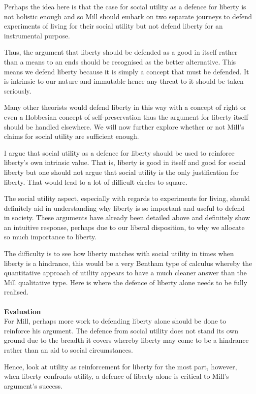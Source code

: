 \documentclass[12pt, letterpaper]{article}
\begin{document}
Perhaps the idea here is that the case for social utility as a defence for liberty is not holistic enough and so Mill should embark on two separate journeys to defend experiments of living for their social utility but not defend liberty for an instrumental purpose.

Thus, the argument that liberty should be defended as a good in itself rather than a means to an ends should be recognised as the better alternative. This means we defend liberty because it is simply a concept that must be defended. It is intrinsic to our nature and immutable hence any threat to it should be taken seriously.

Many other theorists would defend liberty in this way with a concept of right or even a Hobbesian concept of self-preservation thus the argument for liberty itself should be handled elsewhere. We will now further explore whether or not Mill's claims for social utility are sufficient enough.

I argue that social utility as a defence for liberty should be used to reinforce liberty's own intrinsic value. That is, liberty is good in itself and good for social liberty but one should not argue that social utility is the only justification for liberty. That would lead to a lot of difficult circles to square.

The social utility aspect, especially with regards to experiments for living, should definitely aid in understanding why liberty is so important and useful to defend in society. These arguments have already been detailed above and definitely show an intuitive response, perhaps due to our liberal disposition, to why we allocate so much importance to liberty.

The difficulty is to see how liberty matches with social utility in times when liberty is a hindrance, this would be a very Bentham type of calculus whereby the quantitative approach of utility appears to have a much cleaner answer than the Mill qualitative type. Here is where the defence of liberty alone needs to be fully realised.
\\\\
\textbf{Evaluation}
\\
For Mill, perhaps more work to defending liberty alone should be done to reinforce his argument. The defence from social utility does not stand its own ground due to the breadth it covers whereby liberty may come to be a hindrance rather than an aid to social circumstances.

Hence, look at utility as reinforcement for liberty for the most part, however, when liberty confronts utility, a defence of liberty alone is critical to Mill's argument's success.
\end{document}
